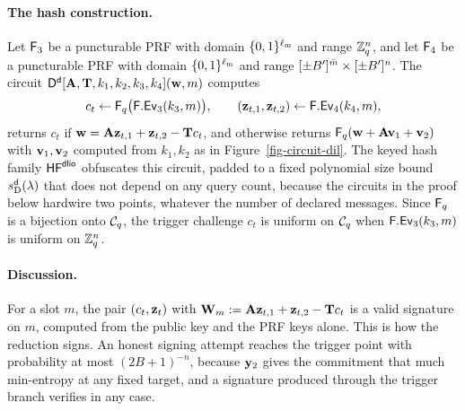 \paragraph*{The hash construction.} Let $\mathsf{F}_3$ be a puncturable PRF with domain $\{0,1\}^{\ell_{\mathrm{m}}}$ and range $\mathbb{Z}_q^n$, and let $\mathsf{F}_4$ be a puncturable PRF with domain $\{0,1\}^{\ell_{\mathrm{m}}}$ and range $[\pm B']^{\bar m} \times [\pm B']^{n}$. The circuit $\mathsf{D}^{\mathsf{d}}[\mathbf{A}, \mathbf{T}, k_1, k_2, k_3, k_4](\mathbf{w}, m)$ computes
$$
c_t \gets \mathsf{F}_q\big(\mathsf{F}.\mathsf{Ev}_3(k_3, m)\big),
\qquad
(\mathbf{z}_{t,1}, \mathbf{z}_{t,2}) \gets \mathsf{F}.\mathsf{Ev}_4(k_4, m),
$$
returns $c_t$ if $\mathbf{w} = \mathbf{A}\mathbf{z}_{t,1} + \mathbf{z}_{t,2} - \mathbf{T}c_t$, and otherwise returns $\mathsf{F}_q(\mathbf{w} + \mathbf{A}\mathbf{v}_1 + \mathbf{v}_2)$ with $\mathbf{v}_1, \mathbf{v}_2$ computed from $k_1, k_2$ as in Figure~\ref{fig-circuit-dil}. The keyed hash family $\mathsf{HF}^{\mathsf{dlio}}$ obfuscates this circuit, padded to a fixed polynomial size bound $s^{\mathsf{d}}_{\mathrm{D}}(\lambda)$ that does not depend on any query count, because the circuits in the proof below hardwire two points, whatever the number of declared messages. Since $\mathsf{F}_q$ is a bijection onto $\mathcal{C}_q$, the trigger challenge $c_t$ is uniform on $\mathcal{C}_q$ when $\mathsf{F}.\mathsf{Ev}_3(k_3,m)$ is uniform on $\mathbb{Z}_q^n$.

\paragraph*{Discussion.} For a slot $m$, the pair $(c_t, \mathbf{z}_t)$ with $\mathbf{W}_m := \mathbf{A}\mathbf{z}_{t,1} + \mathbf{z}_{t,2} - \mathbf{T}c_t$ is a valid signature on $m$, computed from the public key and the PRF keys alone. This is how the reduction signs. An honest signing attempt reaches the trigger point with probability at most $(2B+1)^{-n}$, because $\mathbf{y}_2$ gives the commitment that much min-entropy at any fixed target, and a signature produced through the trigger branch verifies in any case.


